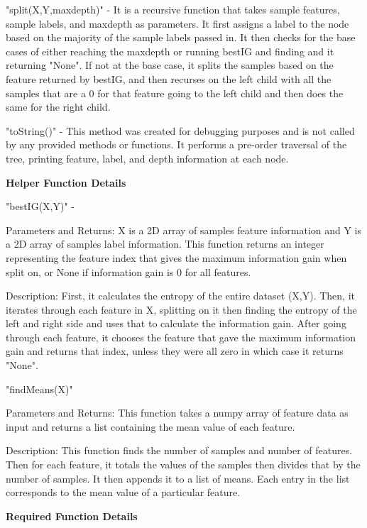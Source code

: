 \documentclass{article}
\begin{document}
\indent \textbullet "split(X,Y,max\textunderscore depth)" - It is a recursive function that takes sample features, sample labels, and max\textunderscore depth as parameters. It first assigns a label to the node based on the majority of the sample labels passed in. It then checks for the base cases of either reaching the max\textunderscore depth or running best\textunderscore IG and finding and it returning "None". If not at the base case, it splits the samples based on the feature returned by best\textunderscore IG, and then recurses on the left child with all the samples that are a 0 for that feature going to the left child and then does the same for the right child.

\indent \textbullet "toString()" - This method was created for debugging purposes and is not called by any provided methods or functions. It performs a pre-order traversal of the tree, printing feature, label, and depth information at each node.

\noindent \textbf{Helper Function Details}

\noindent "best\textunderscore IG(X,Y)" - 

\indent Parameters and Returns: X is a 2D array of samples feature information and Y is a 2D array of samples label information. This function returns an integer representing the feature index that gives the maximum information gain when split on, or None if information gain is 0 for all features.

\indent Description: First, it calculates the entropy of the entire dataset (X,Y). Then, it iterates through each feature in X, splitting on it then finding the entropy of the left and right side and uses that to calculate the information gain. After going through each feature, it chooses the feature that gave the maximum information gain and returns that index, unless they were all zero in which case it returns "None".

\noindent "findMeans(X)" 

\indent Parameters and Returns: This function takes a numpy array of feature data as input and returns a list containing the mean value of each feature.

\indent Description: This function finds the number of samples and number of features. Then for each feature, it totals the values of the samples then divides that by the number of samples. It then appends it to a list of means. Each entry in the list corresponds to the mean value of a particular feature.

\noindent \textbf{Required Function Details}
\end{document}
